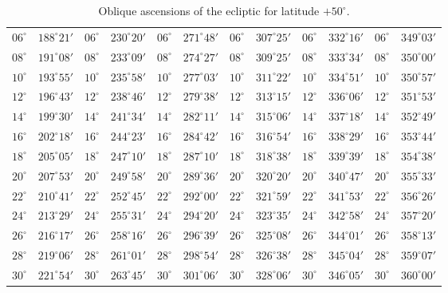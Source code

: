 \begin{table}[!h]
{\begin{tabular}{cc|cc|cc|cc|cc|cc}
$06^\circ$ & $188^\circ21'$ & $06^\circ$ & $230^\circ20'$ & $06^\circ$ & $271^\circ48'$ & $06^\circ$ & $307^\circ25'$ &  $06^\circ$ & $332^\circ16'$ & $06^\circ$ & $349^\circ03'$\\
$08^\circ$ & $191^\circ08'$ & $08^\circ$ & $233^\circ09'$ & $08^\circ$ & $274^\circ27'$ & $08^\circ$ & $309^\circ25'$ &  $08^\circ$ & $333^\circ34'$ & $08^\circ$ & $350^\circ00'$\\
$10^\circ$ & $193^\circ55'$ & $10^\circ$ & $235^\circ58'$ & $10^\circ$ & $277^\circ03'$ & $10^\circ$ & $311^\circ22'$ &  $10^\circ$ & $334^\circ51'$ & $10^\circ$ & $350^\circ57'$\\
$12^\circ$ & $196^\circ43'$ & $12^\circ$ & $238^\circ46'$ & $12^\circ$ & $279^\circ38'$ & $12^\circ$ & $313^\circ15'$ &  $12^\circ$ & $336^\circ06'$ & $12^\circ$ & $351^\circ53'$\\
$14^\circ$ & $199^\circ30'$ & $14^\circ$ & $241^\circ34'$ & $14^\circ$ & $282^\circ11'$ & $14^\circ$ & $315^\circ06'$ &  $14^\circ$ & $337^\circ18'$ & $14^\circ$ & $352^\circ49'$\\
$16^\circ$ & $202^\circ18'$ & $16^\circ$ & $244^\circ23'$ & $16^\circ$ & $284^\circ42'$ & $16^\circ$ & $316^\circ54'$ &  $16^\circ$ & $338^\circ29'$ & $16^\circ$ & $353^\circ44'$\\
$18^\circ$ & $205^\circ05'$ & $18^\circ$ & $247^\circ10'$ & $18^\circ$ & $287^\circ10'$ & $18^\circ$ & $318^\circ38'$ &  $18^\circ$ & $339^\circ39'$ & $18^\circ$ & $354^\circ38'$\\
$20^\circ$ & $207^\circ53'$ & $20^\circ$ & $249^\circ58'$ & $20^\circ$ & $289^\circ36'$ & $20^\circ$ & $320^\circ20'$ &  $20^\circ$ & $340^\circ47'$ & $20^\circ$ & $355^\circ33'$\\
$22^\circ$ & $210^\circ41'$ & $22^\circ$ & $252^\circ45'$ & $22^\circ$ & $292^\circ00'$ & $22^\circ$ & $321^\circ59'$ &  $22^\circ$ & $341^\circ53'$ & $22^\circ$ & $356^\circ26'$\\
$24^\circ$ & $213^\circ29'$ & $24^\circ$ & $255^\circ31'$ & $24^\circ$ & $294^\circ20'$ & $24^\circ$ & $323^\circ35'$ &  $24^\circ$ & $342^\circ58'$ & $24^\circ$ & $357^\circ20'$\\
$26^\circ$ & $216^\circ17'$ & $26^\circ$ & $258^\circ16'$ & $26^\circ$ & $296^\circ39'$ & $26^\circ$ & $325^\circ08'$ &  $26^\circ$ & $344^\circ01'$ & $26^\circ$ & $358^\circ13'$\\
$28^\circ$ & $219^\circ06'$ & $28^\circ$ & $261^\circ01'$ & $28^\circ$ & $298^\circ54'$ & $28^\circ$ & $326^\circ38'$ &  $28^\circ$ & $345^\circ04'$ & $28^\circ$ & $359^\circ07'$\\
$30^\circ$ & $221^\circ54'$ & $30^\circ$ & $263^\circ45'$ & $30^\circ$ & $301^\circ06'$ & $30^\circ$ & $328^\circ06'$ &  $30^\circ$ & $346^\circ05'$ & $30^\circ$ & $360^\circ00'$\\
\end{tabular}}
\caption{Oblique ascensions of the ecliptic for latitude $+50^\circ$.}\label{txx}
\end{table}

